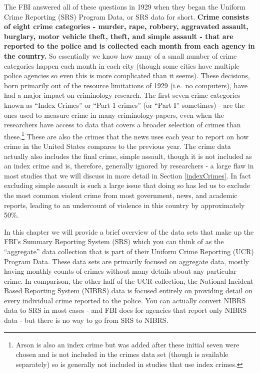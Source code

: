 \documentclass[
]{krantz}
\begin{document}
The FBI answered all of these questions in 1929 when they
began the Uniform Crime Reporting (SRS) Program Data, or SRS
data for short. \textbf{Crime consists of eight crime
categories - murder, rape, robbery, aggravated assault,
burglary, motor vehicle theft, theft, and simple assault -
that are reported to the police and is collected each month
from each agency in the country.} So essentially we know how
many of a small number of crime categories happen each month
in each city (though some cities have multiple police
agencies so even this is more complicated than it seems).
These decisions, born primarily out of the resource
limitations of 1929 (i.e.~no computers), have had a major
impact on criminology research. The first seven crime
categories - known as ``Index Crimes'' or ``Part 1 crimes''
(or ``Part I'' sometimes) - are the ones used to measure
crime in many criminology papers, even when the researchers
have access to data that covers a broader selection of
crimes than these.\footnote{Arson is also an index crime but
  was added after these initial seven were chosen and is not
  included in the crimes data set (though is available
  separately) so is generally not included in studies that
  use index crimes.} These are also the crimes that the news
uses each year to report on how crime in the United States
compares to the previous year. The crime data actually also
includes the final crime, simple assault, though it is not
included as an index crime and is, therefore, generally
ignored by researchers - a large flaw in most studies that
we will discuss in more detail in Section \ref{indexCrimes}.
In fact excluding simple assault is such a large issue that
doing so has led us to exclude the most common violent crime
from most government, news, and academic reports, leading to
an undercount of violence in this country by approximately
50\%.

In this chapter we will provide a brief overview of the
data sets that make up the FBI's Summary Reporting System
(SRS) which you can think of as the ``aggregate'' data
collection that is part of their Uniform Crime Reporting
(UCR) Program Data. These data sets are primarily focused on
aggregate data, mostly having monthly counts of crimes
without many details about any particular crime. In
comparison, the other half of the UCR collection, the
National Incident-Based Reporting System (NIBRS) data is
focused entirely on providing detail on every individual
crime reported to the police. You can actually convert NIBRS
data to SRS in most cases - and FBI does for agencies that
report only NIBRS data - but there is no way to go from SRS
to NIBRS.
\end{document}
